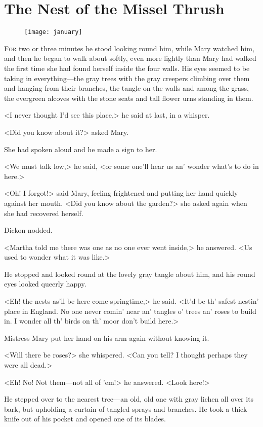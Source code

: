 \chapter{The Nest of the Missel Thrush} 
	
\begin{figure}[t!]
\centering
\texttt{[image: january]}
\end{figure}

 \lettrine[]{F}{or} two or three minutes he stood looking round him, while Mary watched him, and then he began to walk about softly, even more lightly than Mary had walked the first time she had found herself inside the four walls. His eyes seemed to be taking in everything—the gray trees with the gray creepers climbing over them and hanging from their branches, the tangle on the walls and among the grass, the evergreen alcoves with the stone seats and tall flower urns standing in them.

<I never thought I'd see this place,> he said at last, in a whisper.

<Did you know about it?> asked Mary.

She had spoken aloud and he made a sign to her.

<We must talk low,> he said, <or some one'll hear us an' wonder what's to do in here.>

<Oh! I forgot!> said Mary, feeling frightened and putting her hand quickly against her mouth. <Did you know about the garden?> she asked again when she had recovered herself.

Dickon nodded.

<Martha told me there was one as no one ever went inside,> he answered. <Us used to wonder what it was like.>

He stopped and looked round at the lovely gray tangle about him, and his round eyes looked queerly happy.

<Eh! the nests as'll be here come springtime,> he said. <It'd be th' safest nestin' place in England. No one never comin' near an' tangles o' trees an' roses to build in. I wonder all th' birds on th' moor don't build here.>

Mistress Mary put her hand on his arm again without knowing it.

<Will there be roses?> she whispered. <Can you tell? I thought perhaps they were all dead.>

<Eh! No! Not them—not all of 'em!> he answered. <Look here!>

He stepped over to the nearest tree—an old, old one with gray lichen all over its bark, but upholding a curtain of tangled sprays and branches. He took a thick knife out of his pocket and opened one of its blades.

